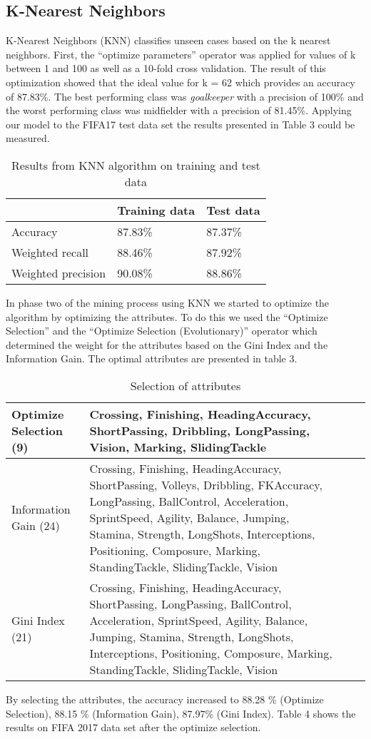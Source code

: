 \subsection{K-Nearest Neighbors}
\label{sec:KNN}
K-Nearest Neighbors (KNN) classifies unseen cases based on the k nearest neighbors. 
First, the ``optimize parameters'' operator was applied for values of k between 1 and 100 as well as a 10-fold cross validation. The result of this optimization showed that the ideal value for k = 62 which provides an accuracy of 87.83\%. The best performing class was \textit{goalkeeper} with a precision of 100\% and the worst performing class was midfielder with a precision of 81.45\%. 
Applying our model to the FIFA17 test data set the results presented in Table 3 could be measured.
\begin{table}[h]
\label{Tab:knn}
\centering
\begin{tabular}{@{}lll@{}}
\hline
                   & Training data & Test data \\ \hline
Accuracy           & 87.83\%       & 87.37\%   \\
Weighted recall    & 88.46\%       & 87.92\%   \\
Weighted precision & 90.08\%       & 88.86\%   \\ \hline
\end{tabular}
\caption{Results from KNN algorithm on training and test data}
\end{table}
In phase two of the mining process using KNN we started to optimize the algorithm by optimizing the attributes.
To do this we used the ``Optimize Selection'' and the ``Optimize Selection (Evolutionary)'' operator which determined the weight for the attributes based on the Gini Index and the Information Gain.
The optimal attributes are presented in table 3.
\begin{table}[h]
\begin{tabular}{p{3.5cm}|p{7.5cm}l|l}
\hline 
Optimize Selection (9) & Crossing, Finishing, HeadingAccuracy, ShortPassing, Dribbling, LongPassing, Vision, Marking, SlidingTackle\\
\hline
Information Gain (24)& Crossing, Finishing, HeadingAccuracy, ShortPassing, Volleys, Dribbling, FKAccuracy, LongPassing, BallControl, Acceleration, SprintSpeed, Agility, Balance, Jumping, Stamina, Strength, LongShots, Interceptions, Positioning, Composure, Marking, StandingTackle, SlidingTackle, Vision \\
\hline 
Gini Index (21) & Crossing, Finishing, HeadingAccuracy, ShortPassing, LongPassing, BallControl, Acceleration, SprintSpeed, Agility, Balance, Jumping, Stamina, Strength, LongShots, Interceptions, Positioning, Composure, Marking, StandingTackle, SlidingTackle, Vision\\ \hline
\end{tabular}
\label{Tab:knn2}
\caption{Selection of attributes}
\end{table}	
By selecting the attributes, the accuracy increased to 88.28 \% (Optimize Selection), 88.15 \% (Information Gain), 87.97\% (Gini Index). Table 4 shows the results on FIFA 2017 data set after the optimize selection.


